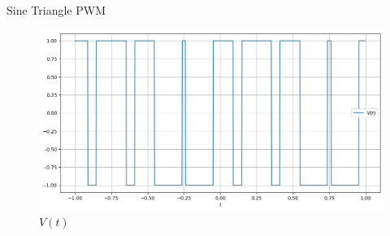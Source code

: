 \documentclass{beamer}
\begin{document}
\begin{frame}{Sine Triangle PWM}
    \begin{figure}
        \centering
        \includegraphics[width= 0.8\linewidth]{square_pwm.png}
        \caption{$V(t)$}
    \end{figure}
\end{frame}
\end{document}
